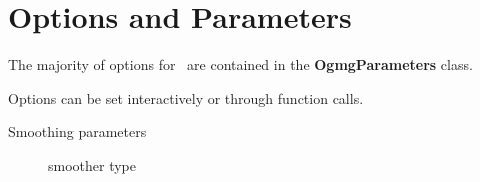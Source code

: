 \documentclass{article}
\begin{document}
\clearpage
\section{Options and Parameters}

The majority of options for \Ogmg\ are contained
in the {\bf OgmgParameters} class. 

Options can be set interactively or through function calls.

\begin{description}
  \item[Smoothing parameters]
    \begin{description}
      \item[smoother type]
    \end{description}
\end{description}
\end{document}
